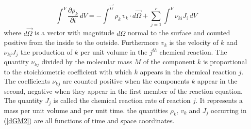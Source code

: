 \begin{equation}
\int^V \frac{\partial \rho_k}{\partial t}\, dV = - \int^\vec{\Omega} \rho_k\, v_k \cdot d\vec{\Omega} + \sum_{j=1}^r \int^V \nu_{ki} J_i\, dV
\label{dGM2}
\end{equation}
where $d\vec{\Omega}$ is a vector with magnitude $d\Omega$ normal to the surface and counted positive from the inside to the outside. Furthermore $v_k$ is the velocity of $k$ and $\nu_{kj} J_j$  the production of $k$ per unit volume in the $j^{th}$ chemical reaction.  The quantity $\nu_{kj}$ divided by the molecular mass $M$ of the component $k$ is proportional to the stoichiometric coefficient with which $k$ appears in the chemical reaction $j$. The coefficients $\nu_{kj}$ are counted positive when the components $k$ appear in the second, negative when they appear in the first member of the reaction equation. The quantity $J_j$ is called the chemical reaction rate of reaction $j$. It represents a mass per unit volume and per unit time. the quantities $\rho_k$, $v_k$ and $J_j$ occurring in (\ref{dGM2}) are all functions of time and space coordinates.